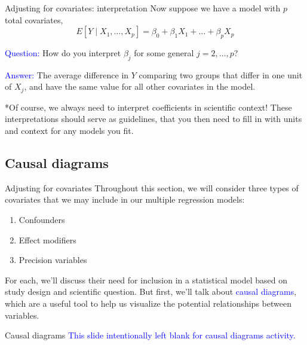 \documentclass[10pt,t]{beamer}
\begin{document}
\begin{frame}{Adjusting for covariates: interpretation}
Now suppose we have a model with $p$ total covariates,
$$
E[Y \mid X_1, \dots, X_p] = \beta_0 + \beta_1 X_1 + \dots + \beta_p X_p
$$

\textcolor{blue}{Question:} How do you interpret $\beta_j$ for some general $j = 2, \dots, p$? \pause

\vspace{0.3cm}

\textcolor{blue}{Answer:} The average difference in $Y$ comparing two groups that differ in one unit of $X_j$, and have the same value for all other covariates in the model. \pause

\vspace{0.3cm}

*Of course, we always need to interpret coefficients in scientific context! These interpretations should serve as guidelines, that you then need to fill in with units and context for any models you fit.
\end{frame}


\subsection{Causal diagrams}

\begin{frame}{Adjusting for covariates}
Throughout this section, we will consider three types of covariates that we may include in our multiple regression models:

\vspace{0.3cm}

\begin{enumerate}
	\item Confounders
	\item Effect modifiers
	\item Precision variables
\end{enumerate}

\vspace{0.3cm}

For each, we'll discuss their need for inclusion in a statistical model based on study design and scientific question. But first, we'll talk about \textcolor{blue}{causal diagrams}, which are a useful tool to help us visualize the potential relationships between variables.

\end{frame}

\begin{frame}{Causal diagrams}
\small \textcolor{blue}{This slide intentionally left blank for causal diagrams activity.}
\end{frame}
\end{document}

